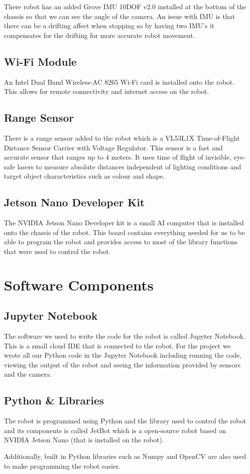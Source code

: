 There robot has an added Grove IMU 10DOF v2.0 installed at the bottom of the chassis so that we can see the angle of the camera. An issue with IMU is that there can be a drifting affect when stopping so by having two IMU’s it compensates for the drifting for more accurate robot movement. 

\subsection{Wi-Fi Module}
An Intel Dual Band Wireless-AC 8265 Wi-Fi card is installed onto the robot. This allows for remote connectivity and internet access on the robot. 

\subsection{Range Sensor}
There is a range sensor added to the robot which is a VL53L1X Time-of-Flight Distance Sensor Carrier with Voltage Regulator. This sensor is a fast and accurate sensor that ranges up to 4 meters. It uses time of flight of invisible, eye-safe lasers to measure absolute distances independent of lighting conditions and target object characteristics such as colour and shape. 

\subsection{Jetson Nano Developer Kit}
The NVIDIA Jetson Nano Developer kit is a small AI computer that is installed onto the chassis of the robot. This board contains everything needed for us to be able to program the robot and provides access to most of the library functions that were used to control the robot. 

\section{Software Components}
\subsection{Jupyter Notebook}
The software we used to write the code for the robot is called Jupyter Notebook. This is a small cloud IDE that is connected to the robot. For the project we wrote all our Python code in the Jupyter Notebook including running the code, viewing the output of the robot and seeing the information provided by sensors and the camera.

\subsection{Python \& Libraries}
The robot is programmed using Python and the library used to control the robot and its components is called JetBot which is a open-source robot based on NVIDIA Jetson Nano (that is installed on the robot). 

Additionally, built in Python libraries such as Numpy and OpenCV are also used to make programming the robot easier.




